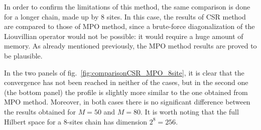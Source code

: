 In order to confirm the limitations of this method, the same comparison is done for a longer chain, made up by 8 sites. In this case, the results of CSR method are compared to those of MPO method, since a brute-force diagonalization of the Liouvillian operator would not be possible: it would require a huge amount of memory. As already mentioned previously, the MPO method results are proved to be plausible.

In the two panels of fig.~\ref{fig:comparisonCSR_MPO_8site}, it is clear that the convergence has not been reached in neither of the cases, but in the second one (the bottom panel) the profile is slightly more similar to the one obtained from MPO method. Moreover, in both cases there is no significant difference between the results obtained for $M = 50$ and $M = 80$. It is worth noting that the full Hilbert space for a 8-sites chain has dimension $2^{8} = 256$.

